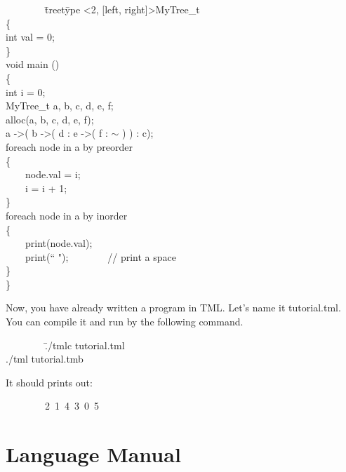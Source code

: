 \documentclass[12pt,psfig,a4]{article}
\begin{document}
\begin{code}
\begin{tabbing}
~~~~~~~~\= treet\=ype \textless2, [left, right]\textgreater MyTree\_t \\
\> \{ \\
\> \>int val = 0;\\
\> \}\\
\>  void main () \\
\> \{ \\
\> \> int i = 0;\\
\> \> MyTree\_t a, b, c, d, e, f;\\
\> \> alloc(a, b, c, d, e, f);\\
\> \> a -\textgreater ( b -\textgreater ( d : e -\textgreater ( f : $\sim$ ) ) : c);\\
\> \> foreach node in a by preorder\\
\> \> \{\\
\> \> ~~~~node.val = i;\\
\> \> ~~~~i = i + 1;\\
\> \> \}\\
\> \> foreach node in a by inorder\\
\> \> \{\\
\> \> ~~~~print(node.val);\\
\> \> ~~~~print(`` ");~~~~~~~~// print a space\\
\> \> \}\\
\> \}
\end{tabbing}
\end{code}

Now, you have already written a program in TML. Let's name it tutorial.tml. You can compile it and run by the following command. 

\begin{code}
\begin{tabbing}
~~~~~~~~\=./tmlc tutorial.tml\\
\>./tml tutorial.tmb
\end{tabbing}
\end{code}

It should prints out:
\begin{code}
\begin{tabbing}
~~~~~~~~2~1~4~3~0~5\\
\end{tabbing}
\end{code}


\pagebreak
\section{Language Manual}
\end{document}
